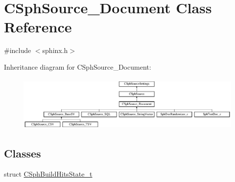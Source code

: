 \hypertarget{classCSphSource__Document}{\section{C\-Sph\-Source\-\_\-\-Document Class Reference}
\label{classCSphSource__Document}
}


{\ttfamily \#include $<$sphinx.\-h$>$}

Inheritance diagram for C\-Sph\-Source\-\_\-\-Document\-:\begin{figure}[H]
\begin{center}
\leavevmode
\includegraphics[height=2.745098cm]{classCSphSource__Document}
\end{center}
\end{figure}
\subsection*{Classes}
\begin{DoxyCompactItemize}
\item 
struct \hyperlink{structCSphSource__Document_1_1CSphBuildHitsState__t}{C\-Sph\-Build\-Hits\-State\-\_\-t}
\end{DoxyCompactItemize}
